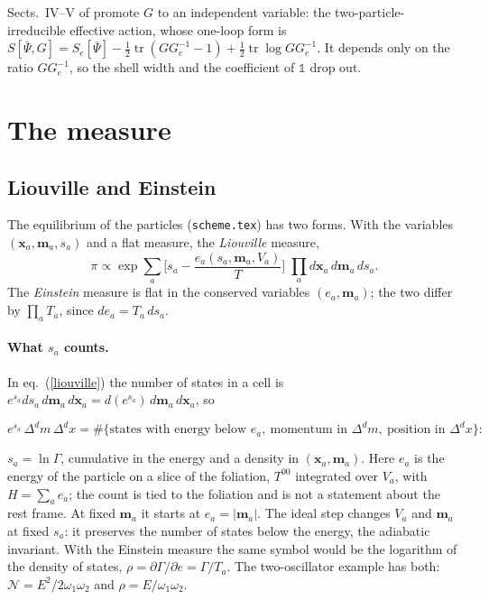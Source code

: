 \documentclass[11pt,aps,preprint,nofootinbib,superscriptaddress,tightenlines]{revtex4-2}
\newcommand{\one}{\mathds{1}}
\def\st{\begin{equation}}
\def\stp{\end{equation}}
\def\Eq#1{eq.~(\ref{#1})}
\def\tr{\operatorname{tr}}
\let\oldparagraph\paragraph
\renewcommand{\paragraph}{\par\bigskip\oldparagraph}
\begin{document}
Sects.~IV--V of \cite{basar} promote $G$ to an independent variable: the two-particle-irreducible effective action, whose one-loop form is
$S[\bar\Psi,G]=S_e[\bar\Psi]-\tfrac12\tr(GG_e^{-1}-1)+\tfrac12\tr\log GG_e^{-1}$.  It depends only on the ratio $GG_e^{-1}$, so the shell width and
the coefficient of $\one$ drop out.

\section{The measure}
\label{sec:measure}

\subsection{Liouville and Einstein}

The equilibrium of the particles (\texttt{scheme.tex}) has two forms.  With the variables $(\bm x_a,\bm m_a,s_a)$ and a flat measure, the
\emph{Liouville} measure,
\st
\pi\propto\exp\sum_a\Big[s_a-\frac{e_a(s_a,\bm m_a,V_a)}T\Big]\;\prod_ad\bm x_a\,d\bm m_a\,ds_a .
\label{liouville}
\stp
The \emph{Einstein} measure is flat in the conserved variables $(e_a,\bm m_a)$; the two differ by $\prod_aT_a$, since $de_a=T_a\,ds_a$.

\paragraph{What $s_a$ counts.}  In \Eq{liouville} the number of states in a cell is $e^{s_a}ds_a\,d\bm m_a\,d\bm x_a=d(e^{s_a})\,d\bm m_a\,d\bm x_a$, so
\begin{keyeq}
\st
e^{s_a}\,\Delta^dm\,\Delta^dx=\#\big\{\text{states with energy below }e_a,\ \text{momentum in }\Delta^dm,\ \text{position in }\Delta^dx\big\} :
\stp
\end{keyeq}
$s_a=\ln\Gamma$, cumulative in the energy and a density in $(\bm x_a,\bm m_a)$.  Here $e_a$ is the energy of the particle on a slice of the
foliation, $T^{00}$ integrated over $V_a$, with $H=\sum_ae_a$; the count is tied to the foliation and is not a statement about the rest frame.
At fixed $\bm m_a$ it starts at $e_a=|\bm m_a|$.  The ideal step changes $V_a$ and $\bm m_a$ at fixed $s_a$: it preserves the number of states
below the energy, the adiabatic invariant.  With the Einstein measure the same symbol would be the logarithm of the density of states,
$\rho=\partial\Gamma/\partial e=\Gamma/T_a$.  The two-oscillator example has both: $\mathcal N=E^2/2\omega_1\omega_2$ and $\rho=E/\omega_1\omega_2$.
\end{document}
